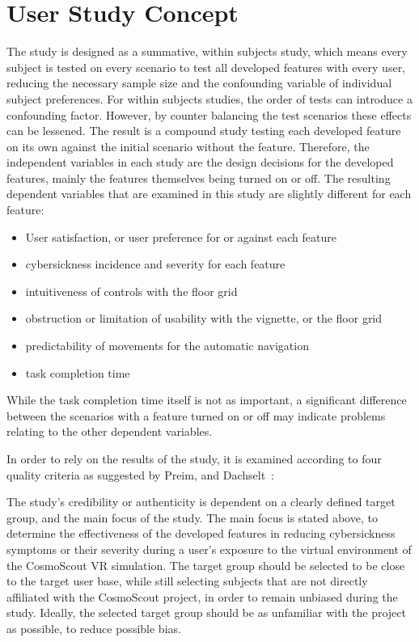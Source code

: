 \section{User Study Concept}\label{sec:user-study-concept}

The study is designed as a summative, within subjects study, which means every subject is tested on every scenario to
test all developed features with every user, reducing the necessary sample size and the confounding variable of
individual subject preferences.
For within subjects studies, the order of tests can introduce a confounding factor.
However, by counter balancing the test scenarios these effects can be lessened.
The result is a compound study testing each developed feature on its own against the initial scenario without the
feature.
Therefore, the independent variables in each study are the design decisions for the developed features, mainly the
features themselves being turned on or off.
The resulting dependent variables that are examined in this study are slightly different for each feature:
\begin{itemize}
    \item User satisfaction, or user preference for or against each feature
    \item cybersickness incidence and severity for each feature
    \item intuitiveness of controls with the floor grid
    \item obstruction or limitation of usability with the vignette, or the floor grid
    \item predictability of movements for the automatic navigation
    \item task completion time
\end{itemize}
While the task completion time itself is not as important, a significant difference between the scenarios with a
feature turned on or off may indicate problems relating to the other dependent variables.

In order to rely on the results of the study, it is examined according to four quality criteria as suggested
by Preim, and Dachselt~\cite{Preim2015}:

The study's credibility or authenticity is dependent on a clearly defined target group, and the main focus of the study.
The main focus is stated above, to determine the effectiveness of the developed features in reducing cybersickness
symptoms or their severity during a user's exposure to the virtual environment of the CosmoScout VR
simulation.
The target group should be selected to be close to the target user base, while still selecting subjects that are not
directly affiliated with the CosmoScout project, in order to remain unbiased during the study.
Ideally, the selected target group should be as unfamiliar with the project as possible, to reduce possible bias.

